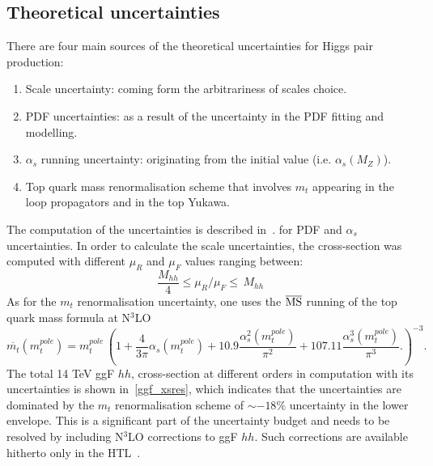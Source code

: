 \subsection{Theoretical uncertainties}
There are four main sources of the theoretical uncertainties for Higgs pair production:
\begin{enumerate}
	\item Scale uncertainty: coming form the arbitrariness of scales choice.
	\item PDF uncertainties: as a result of the uncertainty in the PDF fitting and modelling.
	\item $\alpha_s$ running uncertainty: originating from the initial value (i.e. $\alpha_s(M_Z) $).
	\item Top quark mass renormalisation scheme that involves $m_t$ appearing in the loop propagators and in the top Yukawa.
\end{enumerate}
The computation of the uncertainties is described in~\cite{Martin:2009bu, Demartin:2010er}. for PDF and $\alpha_s$ uncertainties.
In order to calculate the scale uncertainties, the cross-section was computed with different $ \mu_R$ and $\mu_F$ values ranging between:
\begin{equation}
	\frac{M_{hh}}{4} \leq \mu_R/\mu_F  \leq \,M_{hh}
\end{equation}
As for the $m_t$ renormalisation uncertainty, one uses the $\overline{\mathrm{MS}}$ running of the top quark mass formula at N$^3$LO~\cite{Baglio:2020wgt}
\begin{equation}
	\overline{m_t} (m_t^{pole}) =m_t^{pole}\, \left( 1+\frac{4}{3 \pi} \alpha_s(m_t^{pole})+10.9 \frac{\alpha^2_s(m_t^{pole})}{\pi^2} +107.11 \frac{\alpha^3_s(m_t^{pole})}{\pi^3}. \right) ^{-3}.
\end{equation}
The total 14 TeV ggF $hh$, cross-section at different orders in computation with its uncertainties is shown in~\autoref{ggf_xsres}, which indicates that the uncertainties are dominated by the $m_t$ renormalisation scheme of $\sim -18\%$ uncertainty in the lower envelope.  This is a significant part of the uncertainty budget and needs to be resolved by including N$^3$LO corrections to ggF $hh$. Such corrections are available hitherto only in the HTL~\cite{Chen:2019lzz,Chen:2019fhs}. 
%
